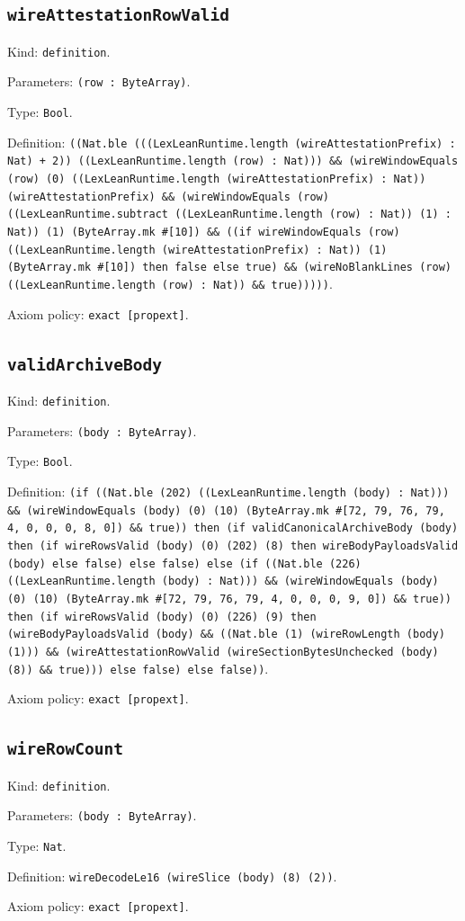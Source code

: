 \documentclass[11pt]{article}
\begin{document}
\subsection*{\texttt{wireAttestationRowValid}}
\noindent Kind: \texttt{definition}.\par
\noindent Parameters: \texttt{(row : ByteArray)}.\par
\noindent Type: \texttt{Bool}.\par
\noindent Definition: \texttt{((Nat.ble (((LexLeanRuntime.length (wireAttestationPrefix) : Nat) + 2)) ((LexLeanRuntime.length (row) : Nat))) \&\& (wireWindowEquals (row) (0) ((LexLeanRuntime.length (wireAttestationPrefix) : Nat)) (wireAttestationPrefix) \&\& (wireWindowEquals (row) ((LexLeanRuntime.subtract ((LexLeanRuntime.length (row) : Nat)) (1) : Nat)) (1) (ByteArray.mk \#[10]) \&\& ((if wireWindowEquals (row) ((LexLeanRuntime.length (wireAttestationPrefix) : Nat)) (1) (ByteArray.mk \#[10]) then false else true) \&\& (wireNoBlankLines (row) ((LexLeanRuntime.length (row) : Nat)) \&\& true)))))}.\par
\noindent Axiom policy: \texttt{exact [propext]}.\par
\subsection*{\texttt{validArchiveBody}}
\noindent Kind: \texttt{definition}.\par
\noindent Parameters: \texttt{(body : ByteArray)}.\par
\noindent Type: \texttt{Bool}.\par
\noindent Definition: \texttt{(if ((Nat.ble (202) ((LexLeanRuntime.length (body) : Nat))) \&\& (wireWindowEquals (body) (0) (10) (ByteArray.mk \#[72, 79, 76, 79, 4, 0, 0, 0, 8, 0]) \&\& true)) then (if validCanonicalArchiveBody (body) then (if wireRowsValid (body) (0) (202) (8) then wireBodyPayloadsValid (body) else false) else false) else (if ((Nat.ble (226) ((LexLeanRuntime.length (body) : Nat))) \&\& (wireWindowEquals (body) (0) (10) (ByteArray.mk \#[72, 79, 76, 79, 4, 0, 0, 0, 9, 0]) \&\& true)) then (if wireRowsValid (body) (0) (226) (9) then (wireBodyPayloadsValid (body) \&\& ((Nat.ble (1) (wireRowLength (body) (1))) \&\& (wireAttestationRowValid (wireSectionBytesUnchecked (body) (8)) \&\& true))) else false) else false))}.\par
\noindent Axiom policy: \texttt{exact [propext]}.\par
\subsection*{\texttt{wireRowCount}}
\noindent Kind: \texttt{definition}.\par
\noindent Parameters: \texttt{(body : ByteArray)}.\par
\noindent Type: \texttt{Nat}.\par
\noindent Definition: \texttt{wireDecodeLe16 (wireSlice (body) (8) (2))}.\par
\noindent Axiom policy: \texttt{exact [propext]}.\par
\end{document}
